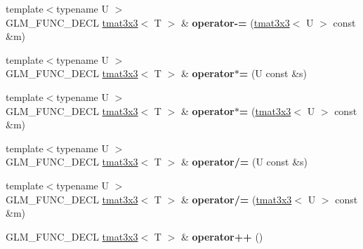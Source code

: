 \begin{DoxyCompactItemize}
\item 
\hypertarget{structglm_1_1detail_1_1tmat3x3_a960ac7281deaadb7e51cd68e4b3ed2ed}{{\footnotesize template$<$typename U $>$ }\\G\-L\-M\-\_\-\-F\-U\-N\-C\-\_\-\-D\-E\-C\-L \hyperlink{structglm_1_1detail_1_1tmat3x3}{tmat3x3}$<$ T $>$ \& {\bfseries operator-\/=} (\hyperlink{structglm_1_1detail_1_1tmat3x3}{tmat3x3}$<$ U $>$ const \&m)}\label{structglm_1_1detail_1_1tmat3x3_a960ac7281deaadb7e51cd68e4b3ed2ed}

\item 
\hypertarget{structglm_1_1detail_1_1tmat3x3_a5e74ec2035c45d8fffc0080798f1a07d}{{\footnotesize template$<$typename U $>$ }\\G\-L\-M\-\_\-\-F\-U\-N\-C\-\_\-\-D\-E\-C\-L \hyperlink{structglm_1_1detail_1_1tmat3x3}{tmat3x3}$<$ T $>$ \& {\bfseries operator$\ast$=} (U const \&s)}\label{structglm_1_1detail_1_1tmat3x3_a5e74ec2035c45d8fffc0080798f1a07d}

\item 
\hypertarget{structglm_1_1detail_1_1tmat3x3_ae9054662de0139020d24b73795f7b336}{{\footnotesize template$<$typename U $>$ }\\G\-L\-M\-\_\-\-F\-U\-N\-C\-\_\-\-D\-E\-C\-L \hyperlink{structglm_1_1detail_1_1tmat3x3}{tmat3x3}$<$ T $>$ \& {\bfseries operator$\ast$=} (\hyperlink{structglm_1_1detail_1_1tmat3x3}{tmat3x3}$<$ U $>$ const \&m)}\label{structglm_1_1detail_1_1tmat3x3_ae9054662de0139020d24b73795f7b336}

\item 
\hypertarget{structglm_1_1detail_1_1tmat3x3_a2bf8199d23a291f1fde6ca5424a34562}{{\footnotesize template$<$typename U $>$ }\\G\-L\-M\-\_\-\-F\-U\-N\-C\-\_\-\-D\-E\-C\-L \hyperlink{structglm_1_1detail_1_1tmat3x3}{tmat3x3}$<$ T $>$ \& {\bfseries operator/=} (U const \&s)}\label{structglm_1_1detail_1_1tmat3x3_a2bf8199d23a291f1fde6ca5424a34562}

\item 
\hypertarget{structglm_1_1detail_1_1tmat3x3_a6c534e0919d17f91d6f5476afd628f0f}{{\footnotesize template$<$typename U $>$ }\\G\-L\-M\-\_\-\-F\-U\-N\-C\-\_\-\-D\-E\-C\-L \hyperlink{structglm_1_1detail_1_1tmat3x3}{tmat3x3}$<$ T $>$ \& {\bfseries operator/=} (\hyperlink{structglm_1_1detail_1_1tmat3x3}{tmat3x3}$<$ U $>$ const \&m)}\label{structglm_1_1detail_1_1tmat3x3_a6c534e0919d17f91d6f5476afd628f0f}

\item 
\hypertarget{structglm_1_1detail_1_1tmat3x3_acf26b11d8dfb7f353ab769152797ae65}{G\-L\-M\-\_\-\-F\-U\-N\-C\-\_\-\-D\-E\-C\-L \hyperlink{structglm_1_1detail_1_1tmat3x3}{tmat3x3}$<$ T $>$ \& {\bfseries operator++} ()}\label{structglm_1_1detail_1_1tmat3x3_acf26b11d8dfb7f353ab769152797ae65}


\end{DoxyCompactItemize}

